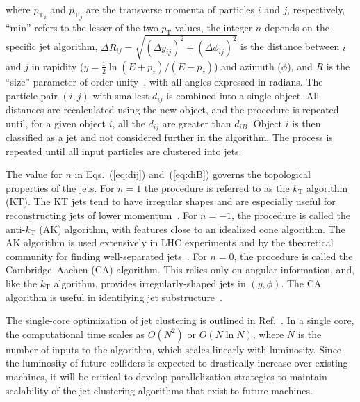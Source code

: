 \documentclass[times,11pt]{article}
\newcommand{\pt}            {\ensuremath{p_{\mathrm{T}}}\xspace}
\begin{document}
where ${\pt}_i$ and ${\pt}_j$ are the transverse momenta of particles
$i$ and $j$, respectively, ``min'' refers
to the lesser of the two $\pt$ values, 
the integer $n$ depends on the specific jet algorithm, $\Delta R_{ij} = \sqrt{(\Delta y_{ij})^2 + (\Delta\phi_{ij})^2 }$
is the distance between $i$ and $j$ in
rapidity ($y = \frac{1}{2} \ln (E + p_{z})/(E - p_{z})$) and azimuth ($\phi$),
and $R$ is the ``size'' parameter of order unity~\cite{ktalg}, with all angles expressed in radians. 
The particle pair $(i,j)$ with smallest $d_{ij}$ is combined into a
single object. All distances are recalculated using the new object, and the procedure is
repeated until, for a given object $i$, all the $d_{ij}$ are greater
than $d_{iB}$. Object $i$ is then
classified as a jet and not considered further in the algorithm. The process is
repeated until all input particles are clustered into jets. 


The value for $n$ in Eqs.~(\ref{eq:dij}) and~(\ref{eq:diB}) governs
the topological properties of the jets. 
For $n=1$ the procedure is referred to as the
$k_{\mathrm{T}}$ algorithm (KT). The KT jets tend to have irregular
shapes and are especially useful for reconstructing jets of lower momentum~\cite{ktalg}.
For $n=-1$, the procedure
is called the anti-$k_{\mathrm{T}}$ (AK) algorithm, with features
close to an idealized cone algorithm. 
The AK algorithm is used extensively
in LHC experiments and by the theoretical community for
finding well-separated jets~\cite{ktalg}. For $n=0$, the procedure
is called the Cambridge--Aachen (CA) algorithm. This relies only on angular
information, and, like the $k_\mathrm{T}$ algorithm,
provides irregularly-shaped jets in $(y,\phi)$. The CA algorithm is useful in identifying
jet substructure~\cite{CAcambridge,CAaachen}.




The single-core optimization of
jet clustering
is outlined in Ref.~\cite{fastjet_timing}. In a single core,
the computational time scales as $O(N^2)$ or  $O(N \ln{N})$, where $N$
is the number of inputs to the algorithm, which scales linearly with
luminosity. Since the luminosity of future colliders is expected to
drastically increase over existing machines, it will be critical to
develop parallelization strategies to maintain scalability of the jet
clustering algorithms that exist to future machines. 
\end{document}
